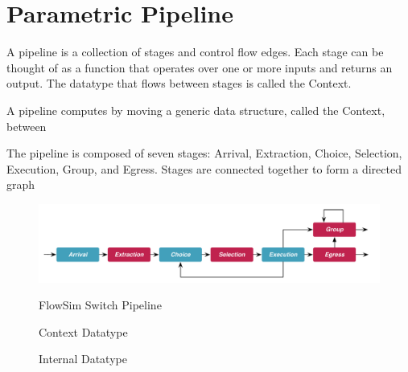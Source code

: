 \section{Parametric Pipeline}



A pipeline is a collection of stages and control flow edges. Each stage can be
thought of as a function that operates over one or more inputs and returns an 
output. The datatype that flows between stages is called the Context.

A pipeline computes
by moving a generic data structure, called the Context, between 

The pipeline is composed of seven stages: Arrival, Extraction, Choice, 
Selection, Execution, Group, and Egress. Stages are connected together to
form a directed graph


\begin{figure}[h]
  \includegraphics[width=\linewidth]{figures/pipeline.pdf}
  \label{figure:pipeline}
  \caption{FlowSim Switch Pipeline}
\end{figure}

\begin{figure}
  
  \label{listing:context}
  \caption{Context Datatype}
\end{figure}

\begin{figure}
  
  \label{listing:internal}
  \caption{Internal Datatype}
\end{figure}
